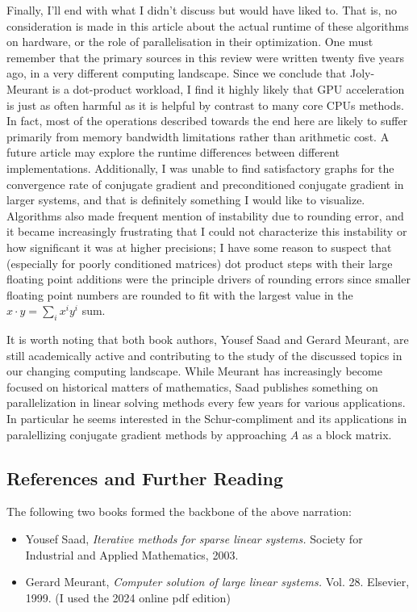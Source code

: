 \documentclass[11pt]{article}
\begin{document}
Finally, I'll end with what I didn't discuss but would have liked to. That is, no consideration is made in this article about the actual runtime of these algorithms on hardware, or the role of parallelisation in their optimization. One must remember that the primary sources in this review were written twenty five years ago, in a very different computing landscape. Since we conclude that Joly-Meurant is a dot-product workload, I find it highly likely that GPU acceleration is just as often harmful as it is helpful by contrast to many core CPUs methods. In fact, most of the operations described towards the end here are likely to suffer primarily from memory bandwidth limitations rather than arithmetic cost. A future article may explore the runtime differences between different implementations. Additionally, I was unable to find satisfactory graphs for the convergence rate of conjugate gradient and preconditioned conjugate gradient in larger systems, and that is definitely something I would like to visualize. Algorithms also made frequent mention of instability due to rounding error, and it became increasingly frustrating that I could not characterize this instability or how significant it was at higher precisions; I have some reason to suspect that (especially for poorly conditioned matrices) dot product steps with their large floating point additions were the principle drivers of rounding errors since smaller floating point numbers are rounded to fit with the largest value in the $x \cdot y = \sum_{i} x^ i y^i$ sum.

It is worth noting that both book authors, Yousef Saad and Gerard Meurant, are still academically active and contributing to the study of the discussed topics in our changing computing landscape. While Meurant has increasingly become focused on historical matters of mathematics, Saad publishes something on parallelization in linear solving methods every few years for various applications. In particular he seems interested in the Schur-compliment and its applications in paralellizing conjugate gradient methods by approaching $A$ as a block matrix.

\subsection{References and Further Reading}

The following two books formed the backbone of the above narration: \begin{itemize}
\item Yousef Saad, \emph{Iterative methods for sparse linear systems.} Society for Industrial and Applied Mathematics, 2003.
\item Gerard Meurant, \emph{Computer solution of large linear systems.} Vol. 28. Elsevier, 1999. (I used the 2024 online pdf edition)
\end{itemize}
\end{document}
